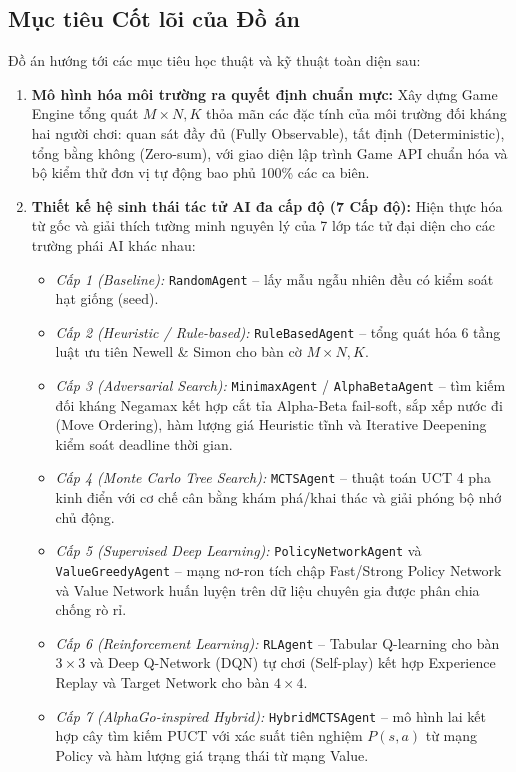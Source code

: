 \documentclass[a4paper,12pt]{report}
\begin{document}
\subsection{Mục tiêu Cốt lõi của Đồ án}
Đồ án hướng tới các mục tiêu học thuật và kỹ thuật toàn diện sau:
\begin{enumerate}[leftmargin=1.5cm]
    \item \textbf{Mô hình hóa môi trường ra quyết định chuẩn mực:} Xây dựng Game Engine tổng quát $M \times N, K$ thỏa mãn các đặc tính của môi trường đối kháng hai người chơi: quan sát đầy đủ (Fully Observable), tất định (Deterministic), tổng bằng không (Zero-sum), với giao diện lập trình Game API chuẩn hóa và bộ kiểm thử đơn vị tự động bao phủ 100\% các ca biên.
    \item \textbf{Thiết kế hệ sinh thái tác tử AI đa cấp độ (7 Cấp độ):} Hiện thực hóa từ gốc và giải thích tường minh nguyên lý của 7 lớp tác tử đại diện cho các trường phái AI khác nhau:
    \begin{itemize}
        \item \textit{Cấp 1 (Baseline):} \texttt{RandomAgent} -- lấy mẫu ngẫu nhiên đều có kiểm soát hạt giống (seed).
        \item \textit{Cấp 2 (Heuristic / Rule-based):} \texttt{RuleBasedAgent} -- tổng quát hóa 6 tầng luật ưu tiên Newell \& Simon cho bàn cờ $M \times N, K$.
        \item \textit{Cấp 3 (Adversarial Search):} \texttt{MinimaxAgent} / \texttt{AlphaBetaAgent} -- tìm kiếm đối kháng Negamax kết hợp cắt tỉa Alpha-Beta fail-soft, sắp xếp nước đi (Move Ordering), hàm lượng giá Heuristic tĩnh và Iterative Deepening kiểm soát deadline thời gian.
        \item \textit{Cấp 4 (Monte Carlo Tree Search):} \texttt{MCTSAgent} -- thuật toán UCT 4 pha kinh điển với cơ chế cân bằng khám phá/khai thác và giải phóng bộ nhớ chủ động.
        \item \textit{Cấp 5 (Supervised Deep Learning):} \texttt{PolicyNetworkAgent} và \texttt{ValueGreedyAgent} -- mạng nơ-ron tích chập Fast/Strong Policy Network và Value Network huấn luyện trên dữ liệu chuyên gia được phân chia chống rò rỉ.
        \item \textit{Cấp 6 (Reinforcement Learning):} \texttt{RLAgent} -- Tabular Q-learning cho bàn $3 \times 3$ và Deep Q-Network (DQN) tự chơi (Self-play) kết hợp Experience Replay và Target Network cho bàn $4 \times 4$.
        \item \textit{Cấp 7 (AlphaGo-inspired Hybrid):} \texttt{HybridMCTSAgent} -- mô hình lai kết hợp cây tìm kiếm PUCT với xác suất tiên nghiệm $P(s, a)$ từ mạng Policy và hàm lượng giá trạng thái từ mạng Value.

\end{itemize}
\end{enumerate}
\end{document}
